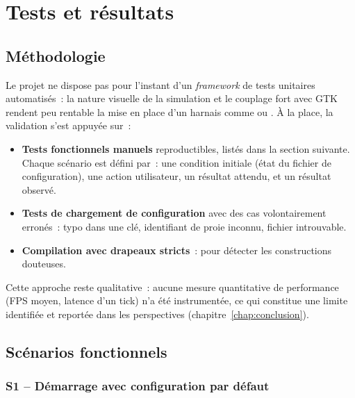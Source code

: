 \chapter{Tests et résultats}
\label{chap:tests}

\section{Méthodologie}

Le projet ne dispose pas pour l'instant d'un \emph{framework} de
tests unitaires automatisés~: la nature visuelle de la
simulation et le couplage fort avec GTK rendent peu rentable la
mise en place d'un harnais comme  ou
. À la place, la validation s'est appuyée sur~:

\begin{itemize}
  \item \textbf{Tests fonctionnels manuels} reproductibles,
    listés dans la section suivante. Chaque scénario est défini
    par~: une condition initiale (état du fichier de
    configuration), une action utilisateur, un résultat attendu,
    et un résultat observé.
  \item \textbf{Tests de chargement de configuration} avec des
    cas volontairement erronés~: typo dans une clé, identifiant
    de proie inconnu, fichier introuvable.
  \item \textbf{Compilation avec drapeaux stricts}~:
     pour détecter les
    constructions douteuses.
\end{itemize}

Cette approche reste qualitative~: aucune mesure quantitative de
performance (FPS moyen, latence d'un tick) n'a été instrumentée,
ce qui constitue une limite identifiée et reportée dans les
perspectives (chapitre~\ref{chap:conclusion}).

\section{Scénarios fonctionnels}

\subsection{S1 -- Démarrage avec configuration par défaut}

